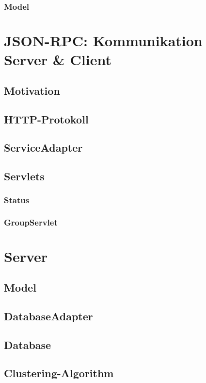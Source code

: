 \documentclass{scrartcl}
\begin{document}
	\subsubsection{Model}
	\newpage

	\section{JSON-RPC: Kommunikation Server \& Client}
	\subsection{Motivation}
	\subsection{HTTP-Protokoll}
	\subsection{ServiceAdapter}
	\subsection{Servlets}
	\subsubsection{Status}
	\subsubsection{GroupServlet}
	\newpage

	\section{Server}
	\subsection{Model}
	\subsection{DatabaseAdapter}
	\subsection{Database}
	\subsection{Clustering-Algorithm}
	\newpage
\end{document}
